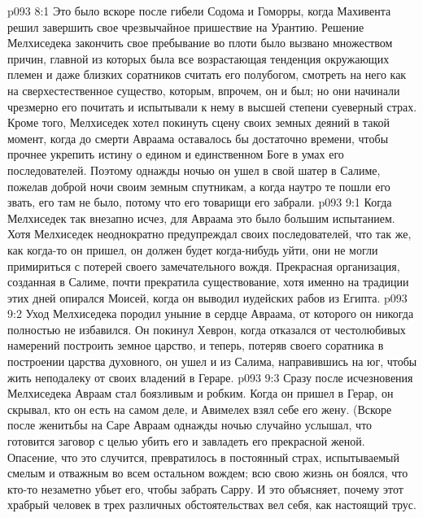 \vs p093 8:1 Это было вскоре после гибели Содома и Гоморры, когда Махивента решил завершить свое чрезвычайное пришествие на Урантию. Решение Мелхиседека закончить свое пребывание во плоти было вызвано множеством причин, главной из которых была все возрастающая тенденция окружающих племен и даже близких соратников считать его полубогом, смотреть на него как на сверхестественное существо, которым, впрочем, он и был; но они начинали чрезмерно его почитать и испытывали к нему в высшей степени суеверный страх. Кроме того, Мелхиседек хотел покинуть сцену своих земных деяний в такой момент, когда до смерти Авраама оставалось бы достаточно времени, чтобы прочнее укрепить истину о едином и единственном Боге в умах его последователей. Поэтому однажды ночью он ушел в свой шатер в Салиме, пожелав доброй ночи своим земным спутникам, а когда наутро те пошли его звать, его там не было, потому что его товарищи его забрали.
\vs p093 9:1 Когда Мелхиседек так внезапно исчез, для Авраама это было большим испытанием. Хотя Мелхиседек неоднократно предупреждал своих последователей, что так же, как когда\hyp{}то он пришел, он должен будет когда\hyp{}нибудь уйти, они не могли примириться с потерей своего замечательного вождя. Прекрасная организация, созданная в Салиме, почти прекратила существование, хотя именно на традиции этих дней опирался Моисей, когда он выводил иудейских рабов из Египта.
\vs p093 9:2 \pc Уход Мелхиседека породил уныние в сердце Авраама, от которого он никогда полностью не избавился. Он покинул Хеврон, когда отказался от честолюбивых намерений построить земное царство, и теперь, потеряв своего соратника в построении царства духовного, он ушел и из Салима, направившись на юг, чтобы жить неподалеку от своих владений в Гераре.
\vs p093 9:3 Сразу после исчезновения Мелхиседека Авраам стал боязливым и робким. Когда он пришел в Герар, он скрывал, кто он есть на самом деле, и Авимелех взял себе его жену. (Вскоре после женитьбы на Саре Авраам однажды ночью случайно услышал, что готовится заговор с целью убить его и завладеть его прекрасной женой. Опасение, что это случится, превратилось в постоянный страх, испытываемый смелым и отважным во всем остальном вождем; всю свою жизнь он боялся, что кто\hyp{}то незаметно убьет его, чтобы забрать Сарру. И это объясняет, почему этот храбрый человек в трех различных обстоятельствах вел себя, как настоящий трус.
